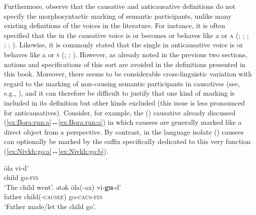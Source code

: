 Furthermore, observe that the causative and anticausative definitions do not specify the morphosyntactic marking of semantic participants, unlike many existing definitions of the voices in the literature. For instance, it is often specified that the  in the causative voice is or becomes or behaves like a  or \textsc{a} (\citealt[31]{dixon:2000}; \citealt[13]{dixon:aikhenvald:2000}; \citealt[1137]{haspelmath:muller-bardey:2004}; \citealt[386]{kulikov:2010}; \citealt[122]{malchukov:2015}; \citeyear[412]{malchukov:2016}). Likewise, it is commonly stated that the single  in anticausative voice is or behaves like a  or \textsc{s} (\citealt[144]{kazenin:1994}; \citealt[7]{dixon:aikhenvald:2000}; \citealt[1132]{haspelmath:muller-bardey:2004}). However, as already noted in the previous two sections, notions and specifications of this sort are avoided in the definitions presented in this book. Moreover, there seems to be considerable cross-linguistic variation with regard to the marking of non-causing semantic participants in causatives (see, e.g., \citealt[45ff.]{dixon:2000}), and it can therefore be difficult to justify that one kind of marking is included in its definition but other kinds excluded (this issue is less pronounced for anticausatives). Consider, for example, the  () causative  already discussed (\ref{ex:Bora:run:a}↔\ref{ex:Bora:run:a}) in which causees are generally marked like a direct object from a  perspective. By contrast, in the language isolate  () causees can optionally be marked by the suffix  specifically dedicated to this very function (\ref{ex:Nivkh:go:a}↔\ref{ex:Nivkh:go:b}).

\ea {} \citep[78]{nedjalkov:al:1995}
\ea\label{ex:Nivkh:go:a}
	\gll	ōla	 vi-d’				 \\
			child	go-\textsc{fin}		\\
	\glt	‘The child went’.
\ex\label{ex:Nivkh:go:b}
	\gll	ətək	ōla(-ax)				 vi-\textbf{gu}-d’		 \\
			father	child(-\textsc{causee})	go-\textsc{caus-fin}	\\
	\glt	‘Father made/let the child go’.
	\z 
\z


